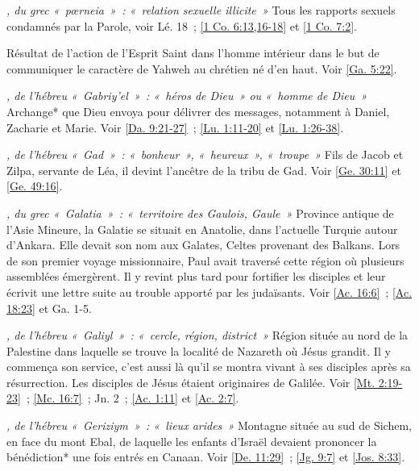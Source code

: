 \begin{multicols}{2}
\textit{, du grec «~pœrneia~»~: «~relation sexuelle illicite~»}\newline
Tous les rapports sexuels condamnés par la Parole, voir Lé. 18~; \vref{1 Co. 6:13,16-18} et \vref{1 Co. 7:2}.

\textit{}\newline
Résultat de l'action de l'Esprit Saint dans l'homme intérieur dans le but de communiquer le caractère de Yahweh au chrétien né d'en haut. Voir \vref{Ga. 5:22}.

\textit{, de l'hébreu «~Gabriy'el~»~: «~héros de Dieu~» ou «~homme de Dieu~»}\newline
Archange* que Dieu envoya pour délivrer des messages, notamment à Daniel, Zacharie et Marie. Voir \vref{Da. 9:21-27}~; \vref{Lu. 1:11-20} et \vref{Lu. 1:26-38}.

\textit{, de l'hébreu «~Gad~»~: «~bonheur~», «~heureux~», «~troupe~»}\newline
Fils de Jacob et Zilpa, servante de Léa, il devint l'ancêtre de la tribu de Gad. Voir \vref{Ge. 30:11} et \vref{Ge. 49:16}.

\textit{, du grec «~Galatia~»~: «~territoire des Gaulois, Gaule~»}\newline
Province antique de l'Asie Mineure, la Galatie se situait en Anatolie, dans l'actuelle Turquie autour d'Ankara. Elle devait son nom aux Galates, Celtes provenant des Balkans. Lors de son premier voyage missionnaire, Paul avait traversé cette région où plusieurs assemblées émergèrent. Il y revint plus tard pour fortifier les disciples et leur écrivit une lettre suite au trouble apporté par les judaïsants. Voir \vref{Ac. 16:6}~; \vref{Ac. 18:23} et Ga. 1-5.

\textit{, de l'hébreu «~Galiyl~»~: «~cercle, région, district~»}\newline
Région située au nord de la Palestine dans laquelle se trouve la localité de Nazareth où Jésus grandit. Il y commença son service, c'est aussi là qu'il se montra vivant à ses disciples après sa résurrection. Les disciples de Jésus étaient originaires de Galilée. Voir \vref{Mt. 2:19-23}~; \vref{Mc. 16:7}~; Jn. 2~; \vref{Ac. 1:11} et \vref{Ac. 2:7}.

\textit{, de l'hébreu «~Geriziym~»~: «~lieux arides~»}\newline
Montagne située au sud de Sichem, en face du mont Ebal, de laquelle les enfants d'Israël devaient prononcer la bénédiction* une fois entrés en Canaan. Voir \vref{De. 11:29}~; \vref{Jg. 9:7} et \vref{Jos. 8:33}.


\end{multicols}
